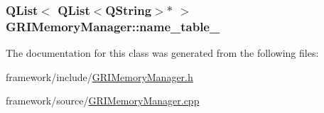 \hypertarget{classGRIMemoryManager_ab2b96c8f5f3c3d9f5216d871657b1d17}{
\subsubsection[{name\-\_\-table\-\_\-}]{\setlength{\rightskip}{0pt plus 5cm}\-Q\-List$<$ \-Q\-List$<$\-Q\-String$>$$\ast$ $>$ {\bf \-G\-R\-I\-Memory\-Manager\-::name\-\_\-table\-\_\-}}}\label{classGRIMemoryManager_ab2b96c8f5f3c3d9f5216d871657b1d17}


\-The documentation for this class was generated from the following files\-:\begin{DoxyCompactItemize}
\item 
framework/include/\hyperlink{GRIMemoryManager_8h}{\-G\-R\-I\-Memory\-Manager.\-h}\item 
framework/source/\hyperlink{GRIMemoryManager_8cpp}{\-G\-R\-I\-Memory\-Manager.\-cpp}\end{DoxyCompactItemize}
